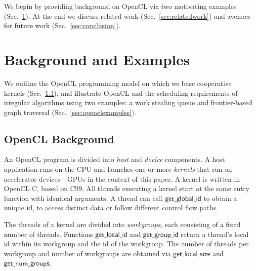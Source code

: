 \documentclass[parskip=half,sigconf,review, anonymous=true, acmcopyrightmode=none]{acmart}
\makeatletter
\renewcommand\paragraph{\@startsection{paragraph}{4}{\z@}%
  {-.5\baselineskip \@plus -2\p@ \@minus -.2\p@}%
  {-3.5\p@}%
  {\bfseries\@parfont}}
\newcommand{\mysec}{Sec.~}
\newcommand{\getgroupid}{\mathsf{get\_group\_id}}
\newcommand{\getnumgroups}{\mathsf{get\_num\_groups}}
\newcommand{\getlocalid}{\mathsf{get\_local\_id}}
\newcommand{\getglobalid}{\mathsf{get\_global\_id}}
\newcommand{\getlocalsize}{\mathsf{get\_local\_size}}
\newcommand{\getglobalsize}{\mathsf{get\_global\_size}}
\makeatother
\begin{document}
We begin by providing background on OpenCL via two motivating examples (\mysec\ref{sec:background}).  At the end we discuss related work (\mysec\ref{sec:relatedwork}) and avenues for future work (\mysec\ref{sec:conclusion}).

\section{Background and Examples}\label{sec:background}

We outline the OpenCL programming model on which we
base cooperative kernels (\mysec\ref{sec:opencl}), and illustrate
OpenCL and the scheduling requirements of irregular algorithms using two examples: a work stealing queue and frontier-based graph traversal
(\mysec\ref{sec:openclexamples}).

\subsection{OpenCL Background}\label{sec:opencl}



An OpenCL program is divided into \emph{host} and \emph{device}
components.  A host application runs on the CPU and launches one or
more \emph{kernels} that run on accelerator devices---GPUs in the
context of this paper.  A kernel is written in OpenCL C, based on C99.
All threads executing a kernel start at the same entry function with
identical arguments.  A thread can call $\getglobalid$
to obtain a unique id, to access distinct data or follow different control flow paths.

The threads of a kernel are divided into \emph{workgroups}, each consisting of a fixed number of threads.  Functions
$\getlocalid$ and $\getgroupid$ return a thread's local id within
its workgroup and the id of the workgroup.
%
%
The number
of threads per workgroup and number of workgroups are obtained via
$\getlocalsize$ and $\getnumgroups$.  
\end{document}
